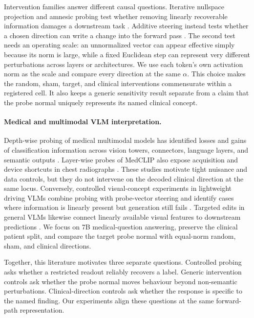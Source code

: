 Intervention families answer different causal questions. Iterative nullspace projection and amnesic probing test whether removing linearly recoverable information damages a downstream task \citep{ravfogel2020null,elazar2021amnesic}. Additive steering instead tests whether a chosen direction can write a change into the forward pass \citep{turner2023steering}. The second test needs an operating scale: an unnormalized vector can appear effective simply because its norm is large, while a fixed Euclidean step can represent very different perturbations across layers or architectures. We use each token's own activation norm as the scale and compare every direction at the same $\alpha$. This choice makes the random, sham, target, and clinical interventions commensurate within a registered cell. It also keeps a generic sensitivity result separate from a claim that the probe normal uniquely represents its named clinical concept.

\paragraph{Medical and multimodal VLM interpretation.}
Depth-wise probing of medical multimodal models has identified losses and gains of classification information across vision towers, connectors, language layers, and semantic outputs \citep{zhu2026lost}. Layer-wise probes of MedCLIP also expose acquisition and device shortcuts in chest radiographs \citep{pedersen2026probes}. These studies motivate tight nuisance and data controls, but they do not intervene on the decoded clinical direction at the same locus. Conversely, controlled visual-concept experiments in lightweight driving VLMs combine probing with probe-vector steering and identify cases where information is linearly present but generation still fails \citep{theodoridis2026probing}. Targeted edits in general VLMs likewise connect linearly available visual features to downstream predictions \citep{rajaram2025lineofsight}. We focus on 7B medical-question answering, preserve the clinical patient split, and compare the target probe normal with equal-norm random, sham, and clinical directions.

Together, this literature motivates three separate questions. Controlled probing asks whether a restricted readout reliably recovers a label. Generic intervention controls ask whether the probe normal moves behaviour beyond non-semantic perturbations. Clinical-direction controls ask whether the response is specific to the named finding. Our experiments align these questions at the same forward-path representation.
